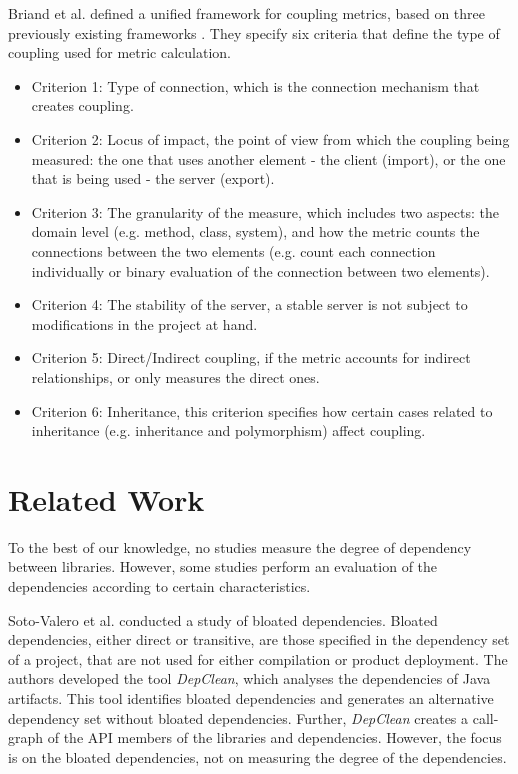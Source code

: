 \documentclass[a4paper]{article}
\begin{document}
Briand et al. \cite{briand1999unified} defined a unified framework for coupling metrics, based on three previously existing frameworks \cite{eder1994coupling,hitz1995measuring,briand1997investigation}. They specify six criteria that define the type of coupling used for metric calculation.

\begin{itemize}
    \item Criterion 1: Type of connection, which is the connection mechanism that creates coupling.
    \item Criterion 2: Locus of impact, the point of view from which the coupling being measured: the one that uses another element - the client (import), or the one that is being used - the server (export).
    \item Criterion 3: The granularity of the measure, which includes two aspects: the domain level (e.g. method, class, system), and how the metric counts the connections between the two elements (e.g. count each connection individually or binary evaluation of the connection between two elements).
    \item Criterion 4: The stability of the server, a stable server is not subject to modifications in the project at hand.
    \item Criterion 5: Direct/Indirect coupling, if the metric accounts for indirect relationships, or only measures the direct ones.
    \item Criterion 6: Inheritance, this criterion specifies how certain cases related to inheritance (e.g. inheritance and polymorphism) affect coupling.
\end{itemize}

\section{Related Work}
To the best of our knowledge, no studies measure the degree of dependency between libraries. However, some studies perform an evaluation of the dependencies according to certain characteristics.

Soto-Valero et al. \cite{soto2020comprehensive} conducted a study of bloated dependencies. Bloated dependencies, either direct or transitive, are those specified in the dependency set of a project, that are not used for either compilation or product deployment. The authors developed the tool \textit{DepClean}, which analyses the dependencies of Java artifacts. This tool identifies bloated dependencies and generates an alternative dependency set without bloated dependencies. Further, \textit{DepClean} creates a call-graph of the API members of the libraries and dependencies. However, the focus is on the bloated dependencies, not on measuring the degree of the dependencies.
\end{document}
